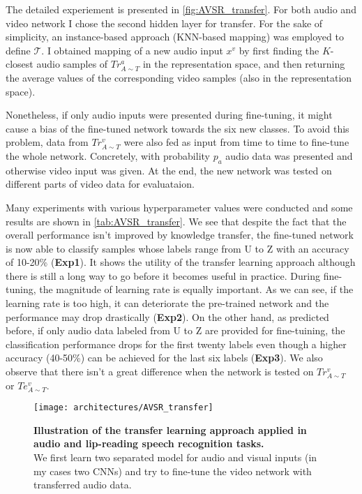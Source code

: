 The detailed experiement is presented in \autoref{fig:AVSR_transfer}.
For both audio and video network I chose the second hidden layer for
transfer. For the sake of simplicity, an instance-based approach
(KNN-based mapping) was employed to define $\mathcal{T}$.
I obtained mapping of a new audio
input $x^v$ by first finding the $K$-closest audio samples of
$Tr_{A\sim T}^a$ in the representation space, and then returning the
average values of the corresponding video samples
(also in the representation space).

Nonetheless, if only audio inputs were presented during fine-tuning, it
might cause a bias of the fine-tuned network towards the six new classes.
To avoid this problem, data from $Tr_{A\sim T}^v$ were also fed as input
from time to time to fine-tune the whole network. Concretely, with
probability $p_a$ audio data was presented and otherwise video input
was given. At the end, the new network was tested on different parts of
video data for evaluataion.

Many experiments with various hyperparameter values were conducted
and some results are shown in \autoref{tab:AVSR_transfer}.
We see that despite the fact that the overall performance isn't improved
by knowledge transfer, the fine-tuned network is now able to classify
samples whose labels range from U to Z with an accuracy of 10-20\%
(\textbf{Exp1}). It shows the utility of the transfer learning approach
although there is still a long way to go before it becomes
useful in practice.
During fine-tuning, the magnitude of learning rate is equally important.
As we can see, if the learning rate is too high, it can deteriorate
the pre-trained network and the performance may drop drastically
(\textbf{Exp2}).
On the other hand, as predicted before, if only audio data labeled from
U to Z are provided for fine-tuining, the classification performance
drops for the first twenty labels even though a higher accuracy (40-50\%)
can be achieved for the last six labels (\textbf{Exp3}).
We also observe that there isn't a great difference when the network is
tested on $Tr_{A\sim T}^v$ or $Te_{A\sim T}^v$.

\begin{figure}[H]
  \centering
  \texttt{[image: architectures/AVSR\_transfer]}\\[-1em]
  \caption{%
    \textbf{Illustration of the transfer learning approach applied in
      audio and lip-reading speech recognition tasks.}\\[0.1em]
    We first learn two separated model for audio and visual inputs
      (in my cases two CNNs) and try to fine-tune the video network
      with transferred audio data.
    }
  \label{fig:AVSR_transfer}
\end{figure}

